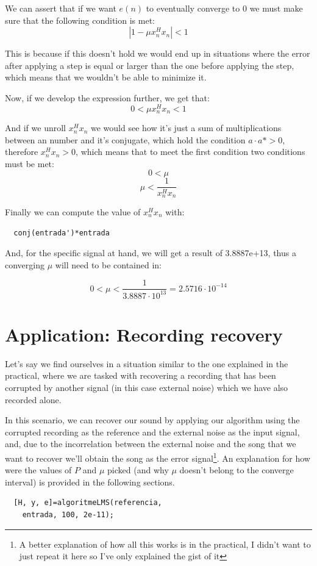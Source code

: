 \documentclass[conference,9pt]{IEEEtran}
\begin{document}
We can assert that if we want $e(n)$ to eventually converge to 0 we must make sure that the following condition is met:
$$|1-\mu x_n^H x_n|<1$$

This is because if this doesn't hold we would end up in situations where the error after applying a step is equal or larger than the one before applying the step, which means that we wouldn't be able to minimize it.

Now, if we develop the expression further, we get that:
$$0 < \mu x_n^H x_n < 1$$

And if we unroll $x_n^H x_n$ we would see how it's just a sum of multiplications between an number and it's conjugate, which hold the condition $a\cdot a*>0$, therefore $x_n^H x_n > 0$, which means that to meet the first condition two conditions must be met:
$$0 < \mu$$
$$\mu < \dfrac{1}{x_n^H x_n}$$

Finally we can compute the value of $x_n^H x_n$ with:
\begin{verbatim}
  conj(entrada')*entrada
\end{verbatim}

And, for the specific signal at hand, we will get a result of 3.8887e+13, thus a converging $\mu$ will need to be contained in:

$$0<\mu <\dfrac{1}{3.8887\cdot 10^{13}}=2.5716\cdot 10^{-14}$$

\section{Application: Recording recovery}
Let's say we find ourselves in a situation similar to the one explained in the practical, where we are tasked with recovering a recording that has been corrupted by another signal (in this case external noise) which we have also recorded alone.

In this scenario, we can recover our sound by applying our algorithm using the corrupted recording as the reference and the external noise as the input signal, and, due to the incorrelation between the external noise and the song that we want to recover we'll obtain the song as the error signal\footnote{A better explanation of how all this works is in the practical, I didn't want to just repeat it here so I've only explained the gist of it}. An explanation for how were the values of $P$ and $\mu$ picked (and why $\mu$ doesn't belong to the converge interval) is provided in the following sections.

\begin{verbatim}
  [H, y, e]=algoritmeLMS(referencia, 
    entrada, 100, 2e-11);
\end{verbatim}
\end{document}
